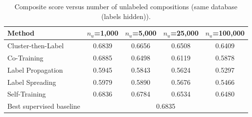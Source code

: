 \begin{table}[H]
\centering\small
\begin{tabular}{lcccc}
\toprule
Method & $n_u$=1,000 & $n_u$=5,000 & $n_u$=25,000 & $n_u$=100,000\\
\midrule
Cluster-then-Label & 0.6839 & 0.6656 & 0.6508 & 0.6409 \\
Co-Training & 0.6885 & 0.6498 & 0.6119 & 0.5878 \\
Label Propagation & 0.5945 & 0.5843 & 0.5624 & 0.5297 \\
Label Spreading & 0.5979 & 0.5890 & 0.5676 & 0.5466 \\
Self-Training & 0.6836 & 0.6784 & 0.6534 & 0.6480 \\
\midrule
Best supervised baseline & \multicolumn{4}{c}{0.6835}\\
\bottomrule
\end{tabular}
\caption*{Composite score versus number of unlabeled compositions (same database (labels hidden)).}
\end{table}
